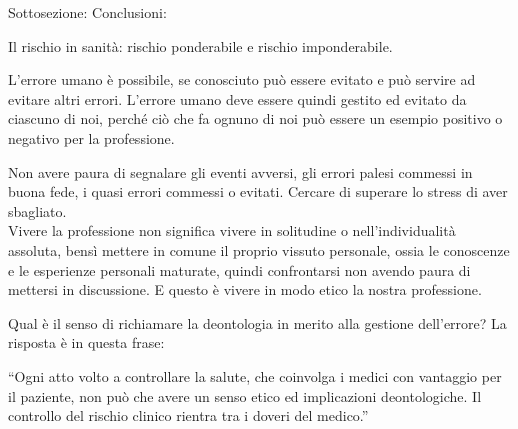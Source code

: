 \documentclass[]{article}
\begin{document}
Sottosezione: Conclusioni:

Il rischio in sanità: rischio ponderabile e rischio imponderabile.

L'errore umano è possibile, se conosciuto può essere evitato e può
servire ad evitare altri errori. L'errore umano deve essere quindi
gestito ed evitato da ciascuno di noi, perché ciò che fa ognuno di noi
può essere un esempio positivo o negativo per la professione.

Non avere paura di segnalare gli eventi avversi, gli errori palesi
commessi in buona fede, i quasi errori commessi o evitati. Cercare di
superare lo stress di aver sbagliato.\\
Vivere la professione non significa vivere in solitudine o
nell'individualità assoluta, bensì mettere in comune il proprio vissuto
personale, ossia le conoscenze e le esperienze personali maturate,
quindi confrontarsi non avendo paura di mettersi in discussione. E
questo è vivere in modo etico la nostra professione.

Qual è il senso di richiamare la deontologia in merito alla gestione
dell'errore? La risposta è in questa frase:

``Ogni atto volto a controllare la salute, che coinvolga i medici con
vantaggio per il paziente, non può che avere un senso etico ed
implicazioni deontologiche. Il controllo del rischio clinico rientra tra
i doveri del medico.''
\end{document}
